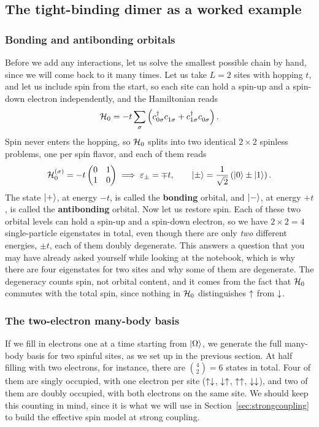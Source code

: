 \documentclass[lecture_notes.tex]{subfiles}
\begin{document}
\subsection{The tight-binding dimer as a worked example}
\label{sec:dimer}
\subsubsection{Bonding and antibonding orbitals}
Before we add any interactions, let us solve the smallest possible chain by hand, since we will
come back to it many times. Let us take $L=2$ sites with hopping $t$, and let us include spin
from the start, so each site can hold a spin-up and a spin-down electron independently, and the
Hamiltonian reads
\begin{equation}
  \Ham_0 = -t \sum_\sigma \left(\cre{0\sigma}\ann{1\sigma} + \cre{1\sigma}\ann{0\sigma}\right).
\end{equation}
Spin never enters the hopping, so $\mathcal{H}_0$ splits into two identical $2\times2$ spinless
problems, one per spin flavor, and each of them reads
\begin{equation}
  \mathcal{H}_0^{(\sigma)} = -t\begin{pmatrix} 0 & 1 \\ 1 & 0\end{pmatrix}
  \;\Longrightarrow\;
  \varepsilon_{\pm} = \mp t, \qquad
  \ket{\pm} = \frac{1}{\sqrt2}\left(\ket{0} \pm \ket{1}\right).
\end{equation}
The state $\ket{+}$, at energy $-t$, is called the \textbf{bonding} orbital, and $\ket{-}$, at
energy $+t$, is called the \textbf{antibonding} orbital. Now let us restore spin. Each of these
two orbital levels can hold a spin-up and a spin-down electron, so we have $2\times 2 = 4$
single-particle eigenstates in total, even though there are only \emph{two} different energies,
$\pm t$, each of them doubly degenerate. This answers a question that you may have already asked
yourself while looking at the notebook, which is why there are four eigenstates for two sites
and why some of them are degenerate. The degeneracy counts spin, not orbital content, and it
comes from the fact that $\mathcal{H}_0$ commutes with the total spin, since nothing in $\mathcal{H}_0$
distinguishes $\uparrow$ from $\downarrow$.

\subsubsection{The two-electron many-body basis}
If we fill in electrons one at a time starting from $\ket{\Omega}$, we generate the full
many-body basis for two spinful sites, as we set up in the previous section. At half filling with
two electrons, for instance, there are $\binom{4}{2}=6$ states in total. Four of them are singly
occupied, with one electron per site ($\uparrow\downarrow$, $\downarrow\uparrow$, $\uparrow\uparrow$, $\downarrow\downarrow$), and two of them
are doubly occupied, with both electrons on the same site. We should keep this counting in mind,
since it is what we will use in Section~\ref{sec:strongcoupling} to build the effective spin
model at strong coupling.
\end{document}
